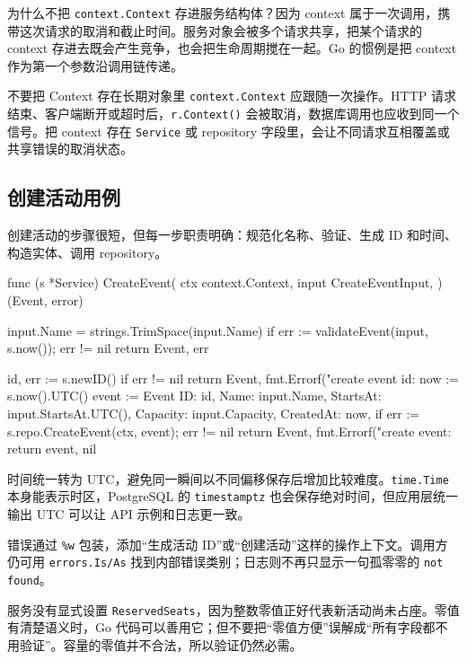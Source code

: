 为什么不把 \texttt{context.Context} 存进服务结构体？因为 context 属于一次调用，携带这次请求的取消和截止时间。服务对象会被多个请求共享，把某个请求的 context 存进去既会产生竞争，也会把生命周期搅在一起。Go 的惯例是把 context 作为第一个参数沿调用链传递。

\begin{warningbox}{不要把 Context 存在长期对象里}
\texttt{context.Context} 应跟随一次操作。HTTP 请求结束、客户端断开或超时后，\texttt{r.Context()} 会被取消，数据库调用也应收到同一个信号。把 context 存在 \texttt{Service} 或 repository 字段里，会让不同请求互相覆盖或共享错误的取消状态。
\end{warningbox}

\subsection{创建活动用例}

创建活动的步骤很短，但每一步职责明确：规范化名称、验证、生成 ID 和时间、构造实体、调用 repository。

\begin{gocode}[title={代码清单 12.18 \texttt{service.go}：创建活动}]
func (s *Service) CreateEvent(
    ctx context.Context,
    input CreateEventInput,
) (Event, error) {
    input.Name = strings.TrimSpace(input.Name)
    if err := validateEvent(input, s.now()); err != nil {
        return Event{}, err
    }

    id, err := s.newID()
    if err != nil {
        return Event{}, fmt.Errorf("create event id: %
    }
    now := s.now().UTC()
    event := Event{
        ID: id, Name: input.Name, StartsAt: input.StartsAt.UTC(),
        Capacity: input.Capacity, CreatedAt: now,
    }
    if err := s.repo.CreateEvent(ctx, event); err != nil {
        return Event{}, fmt.Errorf("create event: %
    }
    return event, nil
}
\end{gocode}

时间统一转为 UTC，避免同一瞬间以不同偏移保存后增加比较难度。\texttt{time.Time} 本身能表示时区，PostgreSQL 的 \texttt{timestamptz} 也会保存绝对时间，但应用层统一输出 UTC 可以让 API 示例和日志更一致。

错误通过 \texttt{\%w} 包装，添加“生成活动 ID”或“创建活动”这样的操作上下文。调用方仍可用 \texttt{errors.Is/As} 找到内部错误类别；日志则不再只显示一句孤零零的 \texttt{not found}。

服务没有显式设置 \texttt{ReservedSeats}，因为整数零值正好代表新活动尚未占座。零值有清楚语义时，Go 代码可以善用它；但不要把“零值方便”误解成“所有字段都不用验证”。容量的零值并不合法，所以验证仍然必需。

